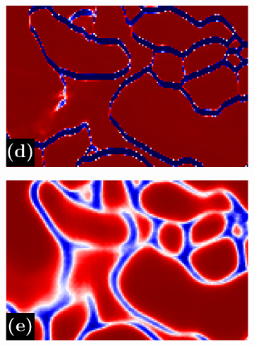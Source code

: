 \begin{figure}[t]
\begin{subfigure}[t]{0.32\linewidth}
\end{subfigure}\vspace{1em}

\begin{subfigure}[t]{0.32\linewidth}
\centering
\includegraphics[width=0.99\linewidth,trim=0in 0in 0in 0.2in,clip]{./figures/LSIMasks/aff_compare_designer/dice_1.pdf} %
\end{subfigure}
\begin{subfigure}[t]{0.32\linewidth}
\centering
\includegraphics[width=0.99\linewidth,trim=0in 0in 0in 0.2in,clip]{./figures/LSIMasks/aff_compare_designer/mask_2.pdf} %
\end{subfigure}
\begin{subfigure}[t]{0.32\linewidth}
\centering

\end{subfigure}
\end{figure}
